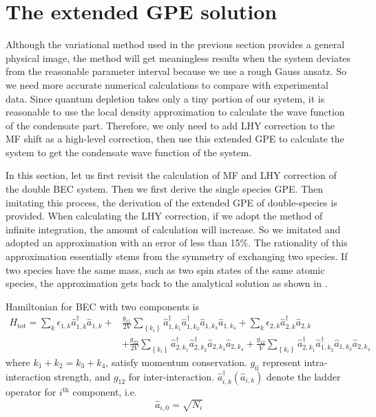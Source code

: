 \section{The extended GPE solution}
\label{sec:eGPE}

Although the variational method used in the previous section provides a general physical image, the method will get meaningless results when the system deviates from the reasonable parameter interval because we use a rough Gauss ansatz. So we need more accurate numerical calculations to compare with experimental data. Since quantum depletion takes only a tiny portion of our system, it is reasonable to use the local density approximation to calculate the wave function of the condensate part. Therefore, we only need to add LHY correction to the MF shift as a high-level correction, then use this extended GPE to calculate the system to get the condensate wave function of the system.

In this section, let us first revisit the calculation of MF and LHY correction of the double BEC system. Then we first derive the single species GPE. Then imitating this process, the derivation of the extended GPE of double-species is provided. When calculating the LHY correction, if we adopt the method of infinite integration, the amount of calculation will increase. So we imitated \cite{Minardi2019} and adopted an approximation with an error of less than 15\%. The rationality of this approximation essentially stems from the symmetry of exchanging two species. If two species have the same mass, such as two spin states of the same atomic species, the approximation gets back to the analytical solution as shown in \cite{petrov2015}.

Hamiltonian for BEC with two components is
\begin{equation}
\begin{split}
H_{\text{tot}}=\sum_k\epsilon_{1,k}\hat{a}_{1,k}^\dagger\hat{a}_{1,k}+&\frac{g_{11}}{2V}\sum_{\left\{k_i\right\}}\hat{a}_{1,k_1}^\dagger\hat{a}_{1,k_2}^\dagger\hat{a}_{1,k_3}\hat{a}_{1,k_4}+\sum_k\epsilon_{2,k}\hat{a}_{2,k}^\dagger\hat{a}_{2,k}\\
&+\frac{g_{22}}{2V}\sum_{\left\{k_i\right\}}\hat{a}_{2,k_1}^\dagger\hat{a}_{2,k_2}^\dagger\hat{a}_{2,k_3}\hat{a}_{2,k_4}+\frac{g_{12}}{V}\sum_{\left\{k_i\right\}}\hat{a}_{2,k_1}^\dagger\hat{a}_{1,k_2}^\dagger\hat{a}_{1,k_3}\hat{a}_{2,k_4}
\end{split}
\end{equation}
where $k_1+k_2=k_3+k_4$, satisfy momentum conservation. $g_{\text{ii}}$ represent intra-interaction strength, and $g_{12}$ for inter-interaction. $\hat{a}_{i,k}^\dagger(\hat{a}_{i,k})$ denote the ladder operator for $i^{\text{th}}$ component, i.e. 
\begin{equation}
\hat{a}_{i,0}=\sqrt{N_i}
\end{equation}

